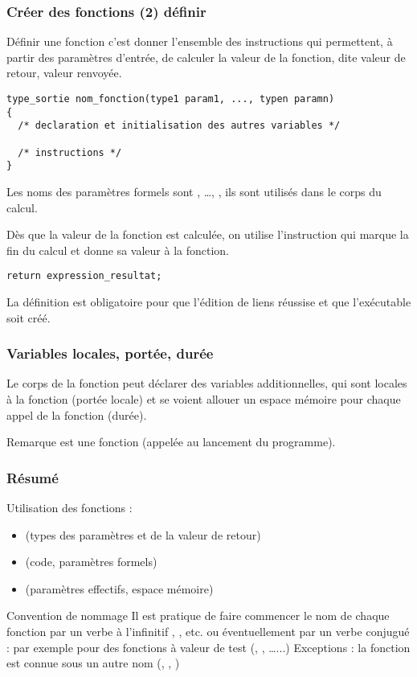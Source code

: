 \documentclass[xcolor=pdftex,svgnames,table]{beamer}
\begin{document}
\begin{frame}[fragile]
  \frametitle{Créer des fonctions (2)  définir}
\pause
Définir une fonction c'est donner l'ensemble des instructions qui
permettent, à partir des paramètres d'entrée, de calculer la valeur de
la fonction, dite valeur de retour, valeur renvoyée.\pause
\begin{lstlisting}[basicstyle=\ttfamily\scriptsize] 
type_sortie nom_fonction(type1 param1, ..., typen paramn)
{
  /* declaration et initialisation des autres variables */
 
  /* instructions */
}
\end{lstlisting}\pause
Les noms des paramètres
formels sont , \ldots, , ils sont utilisés dans le
corps du calcul.
\pause 

Dès que la valeur de la 
fonction est calculée, on utilise l'instruction  qui marque
la fin du calcul et donne sa valeur à la fonction. \pause
\begin{lstlisting}[basicstyle=\ttfamily\small] 
  return expression_resultat;
\end{lstlisting}

La définition est obligatoire pour que l'édition de liens réussise et que l'exécutable soit créé. 
\end{frame}
\begin{frame}
    \frametitle{Variables locales, portée, durée}

    Le corps de la fonction peut déclarer des variables additionnelles,
    qui sont locales à la fonction (portée locale) et se voient allouer un
    espace mémoire pour chaque appel de la fonction (durée).

    \begin{block}{Remarque}  est une fonction (appelée au lancement du
      programme).
    \end{block}
\end{frame}


\begin{frame}
  \frametitle{Résumé}
 Utilisation des fonctions :
  \begin{itemize}
    \item {} (types des paramètres et de la valeur de retour)
    \item {}  (code, paramètres formels)
    \item {} (paramètres effectifs, espace mémoire)
  \end{itemize}
\pause
\begin{block}{Convention de nommage} 
  Il est pratique de faire commencer le nom de chaque fonction par un
  verbe à l'infinitif , ,
  etc. ou éventuellement par un verbe conjugué : par exemple 
  pour des fonctions à valeur de test (,
  , \ldots...)
\pause
Exceptions : la fonction est connue sous un autre nom
  (, , ) 
\end{block}
\end{frame}
\end{document}
